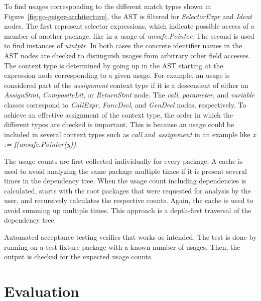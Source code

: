 To find \unsafe{} usages corresponding to the different match types shown in Figure~\ref{fig:go-geiger-architecture},
the \acrshort{AST} is filtered for \textit{SelectorExpr} and \textit{Ident} nodes.
The first represent selector expressions, which indicate possible access of a member of another package, like in a usage
of \textit{unsafe.Pointer}.
The second is used to find instances of \textit{uintptr}.
In both cases the concrete identifier names in the \acrshort{AST} nodes are checked to distinguish \unsafe{} usages from
arbitrary other field accesses.
The context type is determined by going up in the \acrshort{AST} starting at the expression node corresponding to a
given \unsafe{} usage.
For example, an \unsafe{} usage is considered part of the \textit{assignment} context type if it is a descendent of
either an \textit{AssignStmt}, \textit{CompositeLit}, or \textit{ReturnStmt} node.
The \textit{call}, \textit{parameter}, and \textit{variable} classes correspond to \textit{CallExpr}, \textit{FuncDecl},
and \textit{GenDecl} nodes, respectively.
To achieve an effective assignment of the context type, the order in which the different types are checked is important.
This is because an \unsafe{} usage could be included in several context types such as \textit{call} and
\textit{assignment} in an example like \textit{x := f(unsafe.Pointer(y))}.

The \unsafe{} usage counts are first collected individually for every package.
A cache is used to avoid analyzing the same package multiple times if it is present several times in the dependency
tree.
When the usage count including dependencies is calculated, \toolGeiger{} starts with the root packages that were
requested for analysis by the user, and recursively calculates the respective counts.
Again, the cache is used to avoid summing up multiple times.
This approach is a depth-first traversal of the dependency tree.

Automated acceptance testing verifies that \toolGeiger{} works as intended.
The test is done by running \toolGeiger{} on a test fixture package with a known number of \unsafe{} usages.
Then, the output is checked for the expected usage counts.



\section{Evaluation}\label{sec:go-geiger-evaluation}

